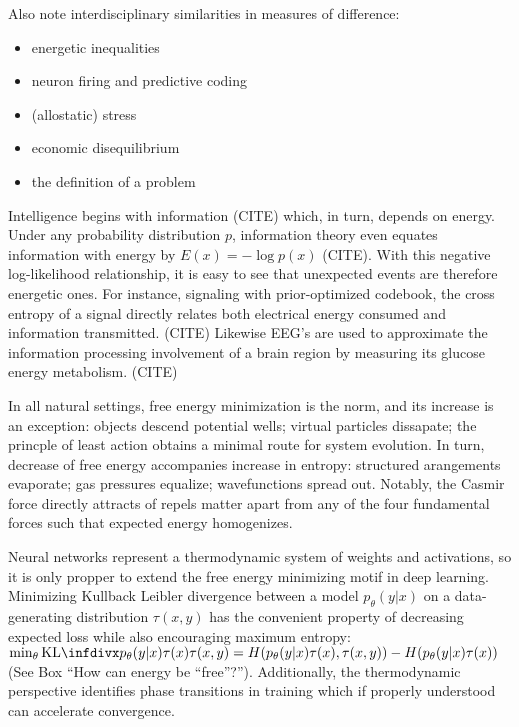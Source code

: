 \begin{WrapText}

Also note interdisciplinary similarities in measures of difference:
\begin{itemize}
 \item energetic inequalities
 \item neuron firing and predictive coding
 \item (allostatic) stress
 \item economic disequilibrium
 \item the definition of a problem
\end{itemize}

\end{WrapText}

Intelligence begins with information (CITE) which, in turn, depends on energy. Under any probability distribution $p$, information theory even equates information with energy by $E(x) = - \log{p(x)} $ (CITE). With this negative log-likelihood relationship, it is easy to see that unexpected events are therefore energetic ones. For instance, signaling with prior-optimized codebook, the cross entropy of a signal directly relates both electrical energy consumed and information transmitted. (CITE) Likewise EEG's are used to approximate the information processing involvement of a brain region by measuring its glucose energy metabolism. (CITE)

In all natural settings, free energy minimization is the norm, and its increase is an exception: objects descend potential wells; virtual particles dissapate; the princple of least action obtains a minimal route for system evolution. In turn, decrease of free energy accompanies increase in entropy: structured arangements evaporate; gas pressures equalize; wavefunctions spread out. Notably, the Casmir force directly attracts of repels matter apart from any of the four fundamental forces such that expected energy homogenizes. 

Neural networks represent a thermodynamic system of weights and activations, so it is only propper to extend the free energy minimizing motif in deep learning. Minimizing Kullback Leibler divergence between a model $p_\theta(y|x)$ on a data-generating distribution $\tau(x,y)$ has the convenient property of decreasing expected loss while also encouraging maximum entropy: $\min_\theta \kld{ p_\theta(y|x)\tau(x) }{ \tau(x,y) } = H(p_\theta(y|x)\tau(x), \tau(x,y)) - H(p_\theta(y|x)\tau(x))$ (See Box ``How can energy be ``free''?''). Additionally, the thermodynamic perspective identifies phase transitions in training which if properly understood can accelerate convergence.

